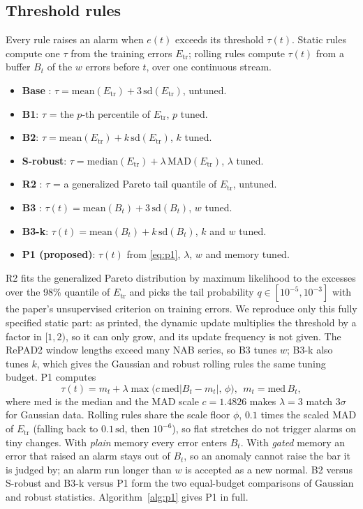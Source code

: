 \documentclass[conference]{IEEEtran}
\begin{document}
\subsection{Threshold rules}
Every rule raises an alarm when $e(t)$ exceeds its threshold $\tau(t)$. Static rules compute one $\tau$ from the training errors $E_{\mathrm{tr}}$; rolling rules compute $\tau(t)$ from a buffer $B_t$ of the $w$ errors before $t$, over one continuous stream.
\begin{itemize}
\item \textbf{Base} \cite{ahmad2026}: $\tau = \mathrm{mean}(E_{\mathrm{tr}}) + 3\,\mathrm{sd}(E_{\mathrm{tr}})$, untuned.
\item \textbf{B1}: $\tau$ = the $p$-th percentile of $E_{\mathrm{tr}}$, $p$ tuned.
\item \textbf{B2}: $\tau = \mathrm{mean}(E_{\mathrm{tr}}) + k\,\mathrm{sd}(E_{\mathrm{tr}})$, $k$ tuned.
\item \textbf{S-robust}: $\tau = \mathrm{median}(E_{\mathrm{tr}}) + \lambda\,\mathrm{MAD}(E_{\mathrm{tr}})$, $\lambda$ tuned.
\item \textbf{R2} \cite{yu2024evt}: $\tau$ = a generalized Pareto tail quantile of $E_{\mathrm{tr}}$, untuned.
\item \textbf{B3} \cite{lee2023repad2}: $\tau(t) = \mathrm{mean}(B_t) + 3\,\mathrm{sd}(B_t)$, $w$ tuned.
\item \textbf{B3-k}: $\tau(t) = \mathrm{mean}(B_t) + k\,\mathrm{sd}(B_t)$, $k$ and $w$ tuned.
\item \textbf{P1 (proposed)}: $\tau(t)$ from \eqref{eq:p1}, $\lambda$, $w$ and memory tuned.
\end{itemize}
R2 fits the generalized Pareto distribution by maximum likelihood to the excesses over the 98\% quantile of $E_{\mathrm{tr}}$ and picks the tail probability $q \in [10^{-5}, 10^{-3}]$ with the paper's unsupervised criterion on training errors. We reproduce only this fully specified static part: as printed, the dynamic update multiplies the threshold by a factor in $[1, 2)$, so it can only grow, and its update frequency is not given. The RePAD2 window lengths exceed many NAB series, so B3 tunes $w$; B3-k also tunes $k$, which gives the Gaussian and robust rolling rules the same tuning budget. P1 computes
\begin{equation}
\tau(t) = m_t + \lambda \max\!\big(c\,\mathrm{med}|B_t - m_t|,\, \phi\big),\ \ m_t = \mathrm{med}\,B_t,
\label{eq:p1}
\end{equation}
where $\mathrm{med}$ is the median and the MAD scale $c = 1.4826$ makes $\lambda = 3$ match $3\sigma$ for Gaussian data. Rolling rules share the scale floor $\phi$, $0.1$ times the scaled MAD of $E_{\mathrm{tr}}$ (falling back to $0.1\,\mathrm{sd}$, then $10^{-6}$), so flat stretches do not trigger alarms on tiny changes. With \emph{plain} memory every error enters $B_t$. With \emph{gated} memory an error that raised an alarm stays out of $B_t$, so an anomaly cannot raise the bar it is judged by; an alarm run longer than $w$ is accepted as a new normal. B2 versus S-robust and B3-k versus P1 form the two equal-budget comparisons of Gaussian and robust statistics. Algorithm~\ref{alg:p1} gives P1 in full.
\end{document}
